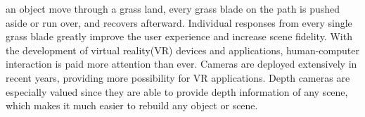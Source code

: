 \documentclass[10pt,journal,compsoc]{IEEEtran}
\begin{document}
\IEEEdisplaynontitleabstractindextext



%
\IEEEpeerreviewmaketitle




 an object move through a grass land, every grass blade on the path is pushed aside or run over, and recovers afterward. Individual responses from every single grass blade greatly improve the user experience and increase scene fidelity. With the development of virtual reality(VR) devices and applications, human-computer interaction is paid more attention than ever. Cameras are deployed extensively in recent years, providing more possibility for VR applications. Depth cameras are especially valued since they are able to provide depth information of any scene, which makes it much easier to rebuild any object or scene.\\
\end{document}
